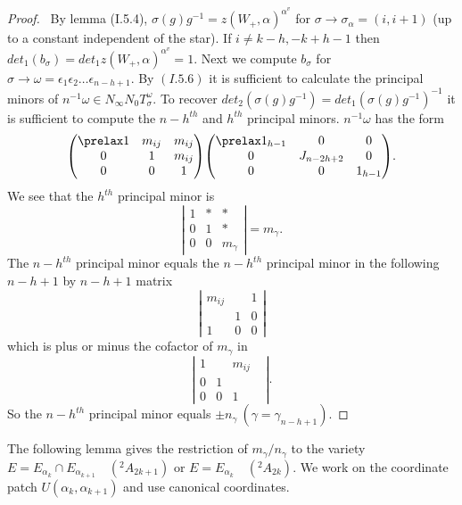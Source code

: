\documentclass{memo-l}
\theoremstyle{definition}
\theoremstyle{remark}
\numberwithin{section}{chapter}
\numberwithin{equation}{chapter}
\begin{document}
\begin{proof} \ By lemma (I.5.4), ${\sigma}(g)g^{-1}  = 
z(W_{+},{\alpha})^{{\alpha}^{v}}$ for ${\sigma} {\to}
{\sigma}_{{\alpha}}  =  (i,i+1)$ (up to a constant independent of the star).
If $i \ne  k-h, -k+h-1$ then $det_{1}(b_{{\sigma}})  = 
det_{1}z(W_{+},{\alpha})^{{\alpha}^{v}} = 1$.  Next we compute
$b_{{\sigma}}$ for ${\sigma} {\to} {\omega}  = 
{\epsilon}_{1}{\epsilon}_{2}\ldots {\epsilon}_{n-h+1}$.  By $(I.5.6)$ it is
sufficient to calculate the principal minors of $n^{-1}{\omega}  \in 
N_{{\infty}}N_{0}T_{{\sigma}}^{\omega}.$ To recover
$det_{2}({\sigma}(g)g^{-1})  =  det_{1}({\sigma}(g)g^{-1})^{-1}$ it is
sufficient to compute the $n-h^{th}$ and $h^{th}$ principal minors.
$n^{-1}{\omega}$ has the form
$$
{\begin{pmatrix} \prelax  1 & m_{ij} & m_{ij} \\ 0 & 1 & m_{ij} \\ 0 & 0 & 1 \end{pmatrix}}
{\begin{pmatrix} \prelax   1_{h-1} & 0 & 0 \\ 0 & J_{n-2h+2} & 0 \\ 0 & 0 & 1_{h-1} \end{pmatrix}} .
$$
We see that the $h^{th}$ principal minor is
$$
\left\vert 
\begin{matrix} 1 & * & * \\ 0 & 1 & * \\ 0 & 0 & m_\gamma 
\end{matrix}
\right\vert 
= m_\gamma.
$$
The $n-h^{th}$ principal minor equals the $n-h^{th}$ principal minor in the
following $n-h+1$ by $n-h+1$ matrix
$$
\left\vert
\begin{matrix}
m_{ij} & & 1 \\ & 1 & 0 \\ 1 & 0 & 0 
\end{matrix}
\right\vert 
$$
which is plus or minus the cofactor of $m_{{\gamma}}$ in
$$
\left\vert
\begin{matrix} 1 && m_{ij} \\ 0 & 1 && \\ 0 & 0 & 1 \end{matrix}
\right\vert.
$$
So the $n-h^{th}$ principal minor equals ${\pm}n_{{\gamma}}\  ({\gamma}
 = {\gamma}_{n-h+1})$.
\end{proof} 

{\medskip} 

The following lemma gives the restriction of
$m_{{\gamma}}/n_{{\gamma}}$ to the variety $E  =  E_{{\alpha_k}} {\cap}
E_{{\alpha_{k+1}}}$\ \  $(^{2}A_{2k+1})$ or $E  =  E_{{\alpha_k}}$\ \ 
$(^{2}A_{2k})$.
We work on the coordinate patch $U({\alpha}_{k},{\alpha}_{k+1})$ and use
canonical coordinates.
\end{document}
